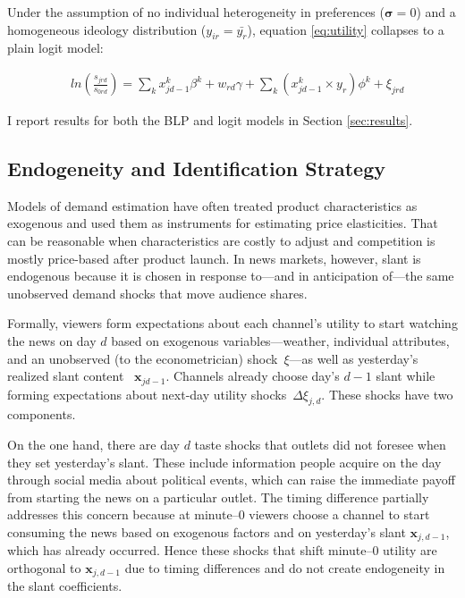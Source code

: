 \documentclass[12pt]{article}
\begin{document}
Under the assumption of no individual heterogeneity in preferences  ($\bm{\sigma}=0$) and a homogeneous ideology distribution ($y_{ir}= \bar{y_r}$),  equation \eqref{eq:utility} collapses to a plain logit model: 


\begin{equation}\label{eq:logit}
	\begin{aligned}
		& ln \left(\frac{s_{jrd}}{s_{0rd}}\right)= \sum_k x_{jd-1}^k\beta^k+w_{rd}   \gamma  +\sum_k \left(x_{jd-1}^k\times y_r \right) \phi^k +  \xi_{jrd}
	\end{aligned} 
\end{equation} 


I report results for both the BLP and  logit models in  Section \ref{sec:results}. 
	
	\subsection{Endogeneity and Identification Strategy} \label{sec:endogeneity}
	\label{sec:identification}
	
	
Models of demand estimation have often treated product characteristics as exogenous and used them as instruments for estimating price elasticities. That can be reasonable when characteristics are costly to adjust and competition is mostly price-based after product launch. In news markets, however, slant is endogenous because it is chosen in response to—and in anticipation of—the same unobserved demand shocks that move audience shares.
	
	
	
	
	
	Formally, viewers form expectations about each channel’s utility to start watching the news on day $d$ based on exogenous variables—weather, individual attributes, and an unobserved (to the econometrician) shock~$\xi$—as well as yesterday’s  realized slant content ~$\bm{x}_{jd-1}$. Channels already choose day's $d-1$ slant while forming expectations about next-day utility shocks~$\Delta\xi_{j,d}$. These shocks have two components.
	
	
	On the one hand, there are day $d$ taste shocks that outlets did not foresee when they set yesterday's slant.  These include information people acquire on the day through social media about political events, which can raise the immediate payoff from starting the news on a particular outlet. The timing difference partially addresses this concern because at minute–0 viewers choose a channel to start consuming the news based on exogenous factors and on yesterday’s slant $\bm{x}_{j,d-1}$, which has already occurred. Hence these shocks that shift minute–0 utility are orthogonal to $\bm{x}_{j,d-1}$ due to timing differences and do not create endogeneity in the slant coefficients.
	
\end{document}
